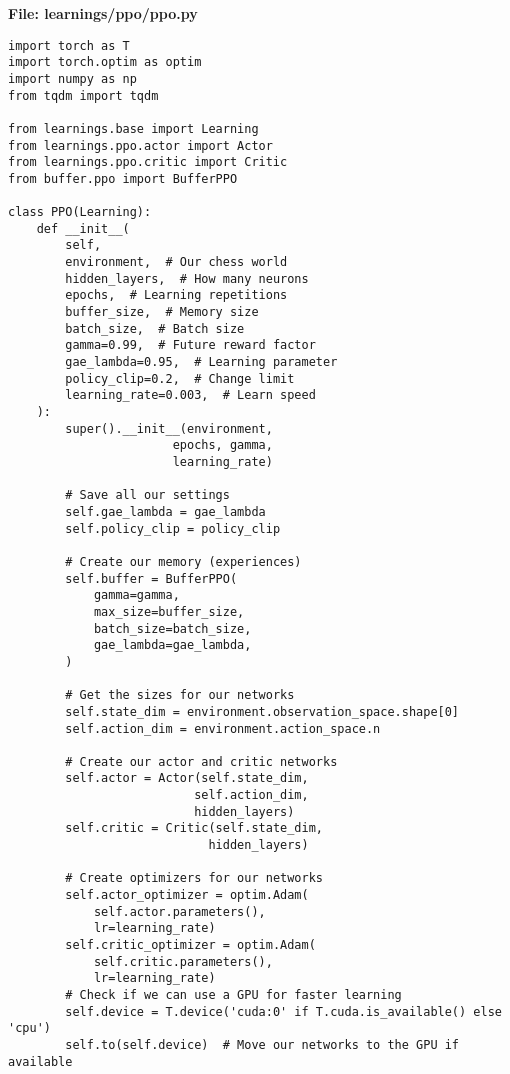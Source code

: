 \documentclass[11pt]{article}
\begin{document}
\begin{tcolorbox}[colback=cyan!5!white,colframe=cyan!75!black,title=Building the PPO Learning System,width=\textwidth]
\textbf{File: learnings/ppo/ppo.py}
\begin{minipage}{0.48\textwidth}
\begin{lstlisting}[style=Python,basicstyle=\ttfamily\scriptsize]
import torch as T
import torch.optim as optim
import numpy as np
from tqdm import tqdm

from learnings.base import Learning
from learnings.ppo.actor import Actor
from learnings.ppo.critic import Critic
from buffer.ppo import BufferPPO

class PPO(Learning):
    def __init__(
        self,
        environment,  # Our chess world
        hidden_layers,  # How many neurons
        epochs,  # Learning repetitions
        buffer_size,  # Memory size
        batch_size,  # Batch size
        gamma=0.99,  # Future reward factor
        gae_lambda=0.95,  # Learning parameter
        policy_clip=0.2,  # Change limit
        learning_rate=0.003,  # Learn speed
    ):
        super().__init__(environment, 
                       epochs, gamma, 
                       learning_rate)
        
        # Save all our settings
        self.gae_lambda = gae_lambda
        self.policy_clip = policy_clip
        
        # Create our memory (experiences)
        self.buffer = BufferPPO(
            gamma=gamma,
            max_size=buffer_size,
            batch_size=batch_size,
            gae_lambda=gae_lambda,
        )
        
        # Get the sizes for our networks
        self.state_dim = environment.observation_space.shape[0]
        self.action_dim = environment.action_space.n
        
        # Create our actor and critic networks
        self.actor = Actor(self.state_dim, 
                          self.action_dim, 
                          hidden_layers)
        self.critic = Critic(self.state_dim, 
                            hidden_layers)
        
        # Create optimizers for our networks
        self.actor_optimizer = optim.Adam(
            self.actor.parameters(), 
            lr=learning_rate)
        self.critic_optimizer = optim.Adam(
            self.critic.parameters(), 
            lr=learning_rate)
        # Check if we can use a GPU for faster learning
        self.device = T.device('cuda:0' if T.cuda.is_available() else 'cpu')
        self.to(self.device)  # Move our networks to the GPU if available
    

\end{lstlisting}
\end{minipage}
\end{tcolorbox}
\end{document}
